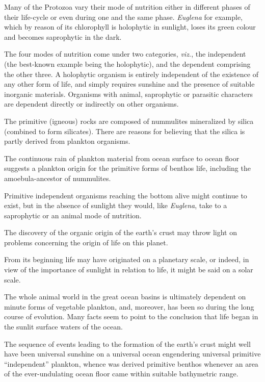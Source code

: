 \documentclass[a4paper, 12pt, oneside, landscape]{article}
\begin{document}
Many of the Protozoa vary their mode of nutrition either in different phases of their life-cycle or even during one and the same phase. \emph{Euglena} for example, which by reason of its chlorophyll is holophytic in sunlight, loses its green colour and becomes saprophytic in the dark.

The four modes of nutrition come under two categories, \emph{viz.}, the independent (the best-known example being the holophytic), and the dependent comprising the other three. A holophytic organism is entirely independent of the existence of any other form of life, and simply requires sunshine and the presence of suitable inorganic materials. Organisms with animal, saprophytic or parasitic characters are dependent directly or indirectly on other organisms.

The primitive (igneous) rocks are composed of nummulites mineralized by silica (combined to form silicates). There are reasons for believing that the silica is partly derived from plankton organisms.

The continuous rain of plankton material from ocean surface to ocean floor suggests a plankton origin for the primitive forms of benthos life, including the amoebula-ancestor of nummulites.

Primitive independent organisms reaching the bottom alive might continue to exist, but in the absence of sunlight they would, like \emph{Euglena}, take to a saprophytic or an animal mode of nutrition.

The discovery of the organic origin of the earth's crust may throw light on problems concerning the origin of life on this planet.

From its beginning life may have originated on a planetary scale, or indeed, in view of the importance of sunlight in relation to life, it might be said on a solar scale.

The whole animal world in the great ocean basins is ultimately dependent on minute forms of vegetable plankton, and, moreover, has been so during the long course of evolution. Many facts seem to point to the conclusion that life began in the sunlit surface waters of the ocean.

The sequence of events leading to the formation of the earth's crust might well have been universal sunshine on a universal ocean engendering universal primitive ``independent'' plankton, whence was derived primitive benthos whenever an area of the ever-undulating ocean floor came within suitable bathymetric range.
\end{document}
